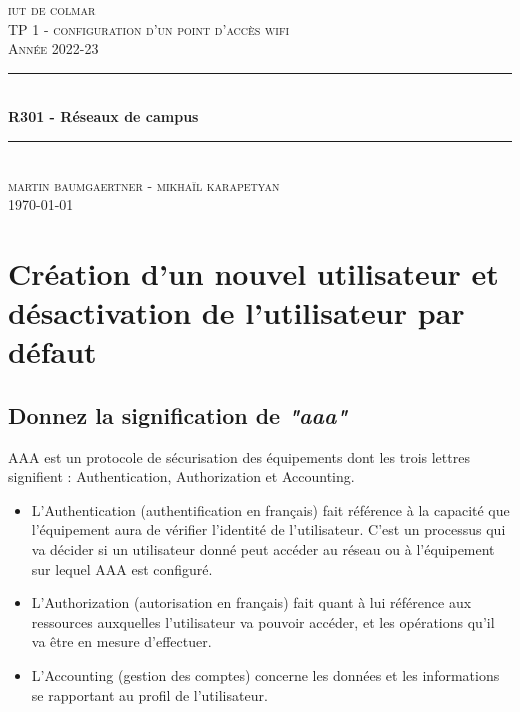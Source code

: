 \documentclass[12pt, a4paper]{article}
\begin{document}
\begin{titlepage}
	\newcommand{\HRule}{\rule{\linewidth}{0.5mm}} 
	\center 
	\textsc{\LARGE iut de colmar}\\[6.5cm] 
	\textsc{\Large TP 1 - configuration d'un point d'accès wifi}\\[0.5cm] 
	\textsc{\large Année 2022-23}\\[0.5cm]
	\HRule\\[0.75cm]
	{\huge\bfseries R301 - Réseaux de campus}\\[0.4cm]
	\HRule\\[1.5cm]
	\textsc{\large martin baumgaertner - mikhaïl karapetyan}\\[6.5cm] 

	\vfill\vfill\vfill
	{\large\today} 
	\vfill
\end{titlepage}
\newpage
\tableofcontents
\listoffigures
\newpage
\section{Création d'un nouvel utilisateur et désactivation de l'utilisateur par défaut}
    \subsection{Donnez la signification de \textit{"aaa"}}
    AAA est un protocole de sécurisation des équipements dont les trois lettres signifient : Authentication, Authorization et Accounting.\\
    \begin{itemize}
        \item L’Authentication (authentification en français) fait référence à la capacité que l’équipement aura de vérifier l’identité de l’utilisateur. C’est un processus qui va décider si un utilisateur donné peut accéder au réseau ou à l’équipement sur lequel AAA est configuré.\\
        \item L’Authorization (autorisation en français) fait quant à lui référence aux ressources auxquelles l’utilisateur va pouvoir accéder, et les opérations qu’il va être en mesure d’effectuer.\\
        \item L’Accounting (gestion des comptes) concerne les données et les informations se rapportant au profil de l’utilisateur.\\
    \end{itemize}
\end{document}
